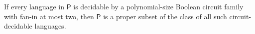 \begin{theorem}
\label{Complexity.P_ssubset_PPoly_of_subset}
\leanok
{}
If every language in $\mathsf{P}$ is decidable by a polynomial-size Boolean circuit
family with fan-in at most two, then $\mathsf{P}$ is a proper subset of the class of all
such circuit-decidable languages.
\end{theorem}
